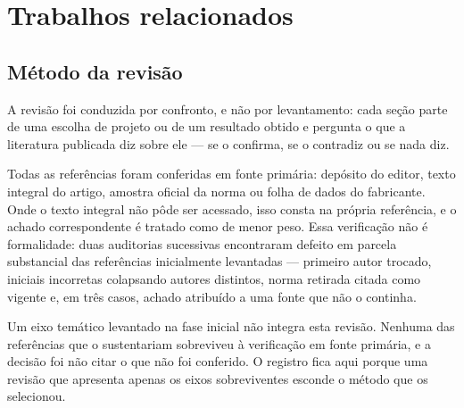 
\makeatletter
{}
\makeatother

\chapter{Trabalhos relacionados}
\label{cap:revisao}

\section{Método da revisão}
\label{sec:rev-metodo}

A revisão foi conduzida por confronto, e não por levantamento: cada seção parte de uma
escolha de projeto ou de um resultado obtido e pergunta o que a literatura publicada diz
sobre ele --- se o confirma, se o contradiz ou se nada diz.

Todas as referências foram conferidas em fonte primária: depósito do editor, texto integral
do artigo, amostra oficial da norma ou folha de dados do fabricante. Onde o texto integral
não pôde ser acessado, isso consta na própria referência, e o achado correspondente é
tratado como de menor peso. Essa verificação não é formalidade: duas auditorias sucessivas
encontraram defeito em parcela substancial das referências inicialmente levantadas ---
primeiro autor trocado, iniciais incorretas colapsando autores distintos, norma retirada
citada como vigente e, em três casos, achado atribuído a uma fonte que não o continha.

Um eixo temático levantado na fase inicial não integra esta revisão. Nenhuma das
referências que o sustentariam sobreviveu à verificação em fonte primária, e a decisão foi
não citar o que não foi conferido. O registro fica aqui porque uma revisão que apresenta
apenas os eixos sobreviventes esconde o método que os selecionou.


